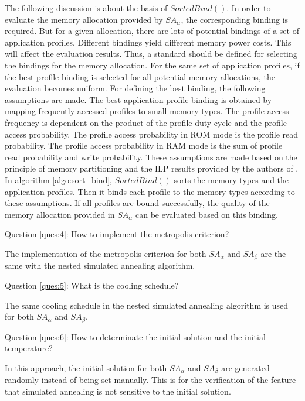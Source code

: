 		The following discussion is about the basis of $SortedBind()$.
		In order to evaluate the memory allocation provided by $SA_{\alpha}$,
		the corresponding binding is required. But for a given allocation,
		there are lots of potential bindings of a set of application profiles.
		Different bindings yield different memory power costs. This will affect
		the evaluation results.
		Thus, a standard should be defined for selecting the bindings for the
		memory allocation. For the same set of application profiles, if the
		best profile binding is selected for all potential memory allocations, the
		evaluation becomes uniform. For defining the best binding, the following
		assumptions are made.
		The best application profile binding is obtained by mapping frequently
		accessed profiles to small memory types. The profile access frequency
		is dependent on the product of the profile duty cycle and the profile access
		probability. The profile access probability in ROM mode is the profile
		read probability. The profile access probability in RAM mode is the
		sum of profile read probability and write probability.
		These assumptions are made based on the principle of memory partitioning and the
		ILP results provided by the authors of \cite{Strobel2016}.
		In algorithm \ref{algo:sort_bind}, $SortedBind()$ sorts the memory types and
		the application profiles. Then it binds each profile to the memory types
		according to these assumptions. If all profiles are bound successfully,
		the quality of the memory allocation provided in $SA_{\alpha}$ can be
		evaluated based on this binding.
		 
		Question \ref{ques:4}: How to implement the metropolis criterion?
		
		The implementation of the metropolis criterion for both $SA_{\alpha}$
		and $SA_{\beta}$ are the same with the nested simulated annealing algorithm.
		
		Question \ref{ques:5}: What is the cooling schedule?
		
		The same cooling schedule in the nested simulated annealing algorithm is
		used for both $SA_{\alpha}$ and $SA_{\beta}$.
		
		Question \ref{ques:6}: How to determinate the initial solution and the
		initial temperature?
		
		In this approach, the initial solution for both $SA_{\alpha}$
		and $SA_{\beta}$ are generated randomly instead of being set manually.
		This is for the verification of the feature that simulated annealing
		is not sensitive to the initial solution.
		
